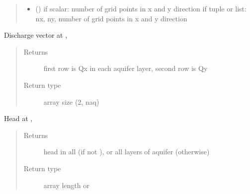\documentclass[letterpaper,10pt,english]{sphinxmanual}
\begin{document}
\begin{fulllineitems}
\begin{fulllineitems}
\begin{quote}
\begin{description}
\begin{itemize}
\item {} 
 (\sphinxstyleliteralemphasis{, }) \textendash{} if scalar: number of grid points in x and y direction
if tuple or list: nx, ny, number of grid points in x and y direction

\end{itemize}

\end{description}\end{quote}

\end{fulllineitems}


\begin{fulllineitems}
\label{\detokenize{models/modelmaq:timml.model.ModelMaq.disvec}}
Discharge vector at , 
\begin{quote}\begin{description}
\item[{Returns}] \leavevmode
{} \textendash{} first row is Qx in each aquifer layer, second row is Qy

\item[{Return type}] \leavevmode
array size (2, naq)

\end{description}\end{quote}

\end{fulllineitems}


\begin{fulllineitems}
\label{\detokenize{models/modelmaq:timml.model.ModelMaq.head}}
Head at , 
\begin{quote}\begin{description}
\item[{Returns}] \leavevmode
{} \textendash{} head in all  (if not ), or all layers of aquifer (otherwise)

\item[{Return type}] \leavevmode
array length  or 


\end{description}
\end{quote}
\end{fulllineitems}
\end{fulllineitems}
\end{document}
